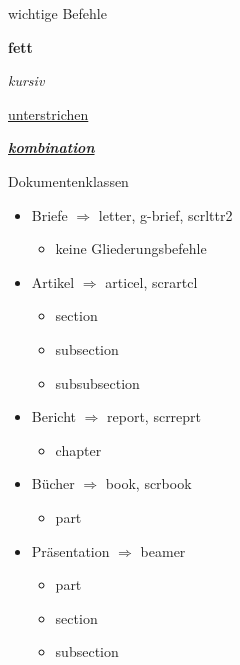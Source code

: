 \begin{frame}{wichtige Befehle}
	
	\begin{block} {\textbf{fett}}
	  
	 \end{block}
	\begin{block}{\textit{kursiv}}
		
	\end{block}  
	\begin{block}{\underline{unterstrichen}}
		
	\end{block} 
	\begin{block}{\textbf{\textit{\underline{kombination}}}}
		 
	\end{block} 
	
\end{frame}

\begin{frame}{Dokumentenklassen}
	\begin{itemize}[<+->]
		\item Briefe $ \Rightarrow $ letter, g-brief, scrlttr2
			\begin{itemize}[<+->]
				\item keine Gliederungsbefehle
			\end{itemize}
		\item Artikel $ \Rightarrow $ articel, scrartcl
			\begin{itemize}[<+->]
				\item section
				\item subsection
				\item subsubsection
			\end{itemize}
		\item Bericht $ \Rightarrow $ report, scrreprt
			\begin{itemize}[<+->]
				\item chapter
			\end{itemize}
		\item Bücher $ \Rightarrow $ book, scrbook
			\begin{itemize}[<+->]
				\item part
			\end{itemize}
		\item Präsentation $ \Rightarrow $ beamer
			\begin{itemize}[<+->]
				\item part
				\item section
				\item subsection
			\end{itemize}
	\end{itemize}
\end{frame}

